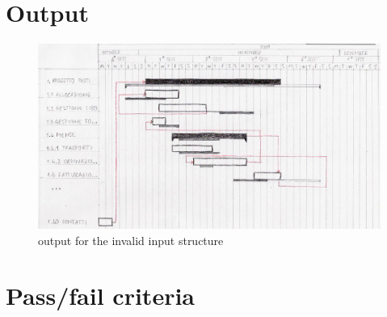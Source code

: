 \section{Output}
\begin{figure} 
\centering
\includegraphics[width=1\textwidth]{case_spec/generate_Gantt/invalidOutput.png}
\caption{output for the invalid input structure}
\end{figure}

\section{Pass/fail criteria}